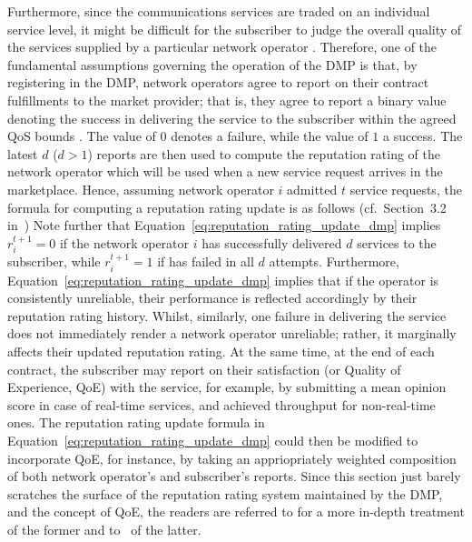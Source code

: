 Furthermore, since the communications services are traded on an individual service level, it might be difficult for the subscriber to judge the overall quality of the services supplied by a particular network operator \cite{DMIrvine02}. Therefore, one of the fundamental assumptions governing the operation of the DMP is that, by registering in the DMP, network operators agree to report on their contract fulfillments to the market provider; that is, they agree to report a binary value denoting the success in delivering the service to the subscriber within the agreed QoS bounds \cite{DMLeBodic00}. The value of $0$ denotes a failure, while the value of $1$ a success. The latest $d$ ($d>1$) reports are then used to compute the reputation rating of the network operator which will be used when a new service request arrives in the marketplace. Hence, assuming network operator $i$ admitted $t$ service requests, the formula for computing a reputation rating update is as follows (cf.~Section~3.2 in~\cite{DMLeBodic00})  Note further that Equation~\eqref{eq:reputation_rating_update_dmp} implies $r_i^{t+1} = 0$ if the network operator $i$ has successfully delivered $d$ services to the subscriber, while $r_i^{t+1} = 1$ if has failed in all $d$ attempts. Furthermore, Equation~\eqref{eq:reputation_rating_update_dmp} implies that if the operator is consistently unreliable, their performance is reflected accordingly by their reputation rating history. Whilst, similarly, one failure in delivering the service does not immediately render a network operator unreliable; rather, it marginally affects their updated reputation rating. At the same time, at the end of each contract, the subscriber may report on their satisfaction (or Quality of Experience, QoE) with the service, for example, by submitting a mean opinion score in case of real-time services, and achieved throughput for non-real-time ones. The reputation rating update formula in Equation~\eqref{eq:reputation_rating_update_dmp} could then be modified to incorporate QoE, for instance, by taking an appriopriately weighted composition of both network operator's and subscriber's reports. Since this section just barely scratches the surface of the reputation rating system maintained by the DMP, and the concept of QoE, the readers are referred to \cite{DMLeBodic00,DMIrvine01,DMIrvine02,LeBodicThesis,DMMathur02,DMMcDiarmid06} for a more in-depth treatment of the former and to~\cite{Kilkki2008, BrooksHestnes2010, Fiedler2010, Shaikh2010} of the latter.

